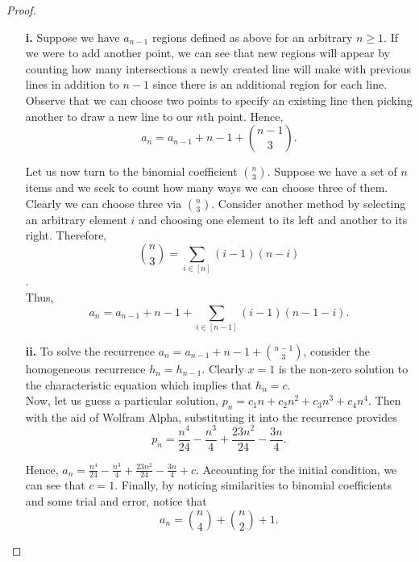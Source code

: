 \documentclass[ 12pt ]{article}
\begin{document}
\begin{enumerate}
		\begin{proof}
			\begin{enumerate}
				\item[\textbf{i.}] Suppose we have $a_{n-1}$ regions defined as above for an arbitrary $n \geq 1$. If we were to add another point, we can see that new regions will
					appear by counting how many intersections a newly created line will make with previous lines in addition to $n-1$ since there is an additional region for each line.
					Observe that we can choose two points to specify an existing line then picking another to draw a new line to our $n$th point. Hence, $$a_n = a_{n-1} + n - 1 +
					\binom{n-1}{3}.$$

					Let us now turn to the binomial coefficient $\binom{n}{3}$. Suppose we have a set of $n$ items and we seek to count how many ways we can choose three of them.
					Clearly we can choose three via $\binom{n}{3}$. Consider another method by selecting an arbitrary element $i$ and choosing one element to its left and another to
					its right. Therefore, $$\binom{n}{3} = \sum_{i \in [n]} (i - 1)(n - i)$$. \\

					Thus, $$a_n = a_{n-1} + n - 1 + \sum_{i \in [n-1]} (i - 1)(n - 1 - i).$$

				\item[\textbf{ii.}] To solve the recurrence $a_n = a_{n-1} + n - 1 + \binom{n-1}{3}$, consider the homogeneous recurrence $h_n = h_{n-1}$. Clearly $x = 1$ is the
					non-zero solution to the characteristic equation which implies that $h_n = c$. \\

					Now, let us guess a particular solution, $p_n = c_1 n + c_2 n^2 + c_3 n^3 + c_4 n^4$. Then with the aid of Wolfram Alpha, substituting it into the recurrence
					provides $$p_n = \frac{n^4}{24} - \frac{n^3}{4} + \frac{23n^2}{24} - \frac{3n}{4}.$$

					Hence, $a_n = \frac{n^4}{24} - \frac{n^3}{4} + \frac{23n^2}{24} - \frac{3n}{4} + c$. Accounting for the initial condition, we can see that $c = 1$. Finally,
					by noticing similarities to binomial coefficients and some trial and error, notice that $$a_n = \binom{n}{4} + \binom{n}{2} + 1.$$
			\end{enumerate}
		\end{proof}

\end{enumerate}
\end{document}
